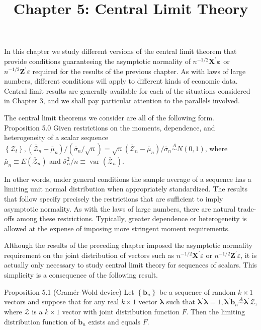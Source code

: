 \documentclass[10pt]{article}
\title{Chapter 5: Central Limit Theory}
\author{}
\date{}
\begin{document}
\maketitle

In this chapter we study different versions of the central limit theorem that provide conditions guaranteeing the asymptotic normality of $n^{-1 / 2} \mathbf{X}^{\prime} \boldsymbol{\varepsilon}$ or $n^{-1 / 2} \mathbf{Z}^{\prime} \varepsilon$ required for the results of the previous chapter. As with laws of large numbers, different conditions will apply to different kinds of economic data. Central limit results are generally available for each of the situations considered in Chapter 3, and we shall pay particular attention to the parallels involved.

The central limit theorems we consider are all of the following form.\\
Proposition 5.0 Given restrictions on the moments, dependence, and heterogeneity of a scalar sequence $\left\{\mathcal{Z}_{t}\right\},\left(\overline{\mathcal{Z}}_{n}-\bar{\mu}_{n}\right) /\left(\bar{\sigma}_{n} / \sqrt{n}\right)=\sqrt{n}\left(\overline{\mathcal{Z}}_{n}-\right. \left.\bar{\mu}_{n}\right) / \bar{\sigma}_{n} \stackrel{A}{\sim} N(0,1)$, where $\bar{\mu}_{n} \equiv E\left(\overline{\mathcal{Z}}_{n}\right)$ and $\bar{\sigma}_{n}^{2} / n \equiv \operatorname{var}\left(\overline{\mathcal{Z}}_{n}\right)$.

In other words, under general conditions the sample average of a sequence has a limiting unit normal distribution when appropriately standardized. The results that follow specify precisely the restrictions that are sufficient to imply asymptotic normality. As with the laws of large numbers, there are natural trade-offs among these restrictions. Typically, greater dependence or heterogeneity is allowed at the expense of imposing more stringent moment requirements.

Although the results of the preceding chapter imposed the asymptotic normality requirement on the joint distribution of vectors such as $n^{-1 / 2} \mathbf{X}^{\prime} \varepsilon$ or $n^{-1 / 2} \mathbf{Z}^{\prime} \varepsilon$, it is actually only necessary to study central limit theory for sequences of scalars. This simplicity is a consequence of the following result.

Proposition 5.1 (Cramér-Wold device) Let $\left\{\mathbf{b}_{n}\right\}$ be a sequence of random $k \times 1$ vectors and suppose that for any real $k \times 1$ vector $\boldsymbol{\lambda}$ such that $\boldsymbol{\lambda}^{\prime} \boldsymbol{\lambda}=1, \boldsymbol{\lambda}^{\prime} \mathbf{b}_{n} \stackrel{A}{\sim} \boldsymbol{\lambda}^{\prime} \mathcal{Z}$, where $\mathcal{Z}$ is a $k \times 1$ vector with joint distribution function $F$. Then the limiting distribution function of $\mathbf{b}_{n}$ exists and equals $F$.
\end{document}
